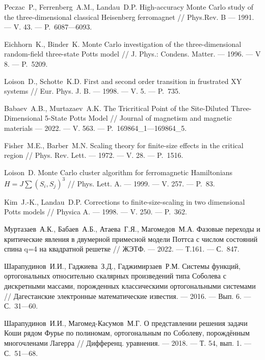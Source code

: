 \begin{thebibliography}{111}
Peczac~P., Ferrenberg~A.M., Landau~D.P. 
High-accuracy Monte Carlo study of the three-dimensional classical Heisenberg ferromagnet // Phys.Rev. B 
--- 1991. 
--- V. 43. 
--- P.~6087---6093.

Eichhorn~K., Binder~K. 
Monte Carlo investigation of the three-dimensional random-field three-state Potts model 
// 
J. Phys.: Condens. Matter.
--- 1996. 
--- V 8. 
--- P.~5209.

Loison~D., Schotte~K.D. 
First and second order transition in frustrated XY systems 
// 
Eur. Phys. J. B. 
--- 1998. 
--- V. 5. 
--- P.~735.

Babaev~A.B., Murtazaev~A.K. 
The Tricritical Point of the Site-Diluted Three-Dimensional 5-State Potts Model // Journal of magnetism and magnetic materials 
--- 2022. 
--- V. 563. 
--- P.~169864\_1---169864\_5.

Fisher~M.E., Barber~M.N. 
Scaling theory for finite-size effects in the critical region 
// 
Phys. Rev. Lett. 
--- 1972. 
--- V. 28. 
--- P.~1516.

Loison~D. 
Monte Carlo cluster algorithm for ferromagnetic Hamiltonians $H = J\sum(S_i, S_j)^3$ 
// 
Phys. Lett. A. 
--- 1999. 
--- V. 257. 
--- P.~83.

Kim~J.-K., Landau~D.P. 
Corrections to finite-size-scaling in two dimensional Potts models 
// 
Physica A. 
--- 1998. 
--- V. 250. 
--- P.~362.

Муртазаев~А.К., Бабаев~А.Б., Атаева~Г.Я., Магомедов~М.А. 
Фазовые переходы и критические явления в двумерной примесной модели Поттса с числом состояний спина q=4 на квадратной решетке 
// 
ЖЭТФ. 
--- 2022.
--- Т.161.
--- С.~847.


{Шарапудинов~И.И., Гаджиева~З.Д., Гаджимирзаев~Р.М.} 
Системы функций, ортогональных относительно скалярных произведений типа Соболева с дискретными массами, порожденных классическими ортогональными системами 
// 
Дагестанские электронные математические известия. 
--- 2016. 
--- Вып. 6.
--- С.~31---60.

{Шарапудинов~И.И., Магомед-Касумов~М.Г.} 
О представлении решения задачи Коши рядом Фурье по полиномам, ортогональным по Соболеву, порождённым многочленами Лагерра 
// 
Дифференц. уравнения. 
--- 2018. 
--- Т. 54, вып. 1. 
--- С.~51---68.


\end{thebibliography}
